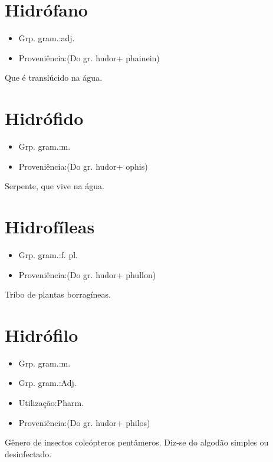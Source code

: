 \documentclass{article}
\begin{document}
\section{Hidrófano}
\begin{itemize}
\item {Grp. gram.:adj.}
\end{itemize}
\begin{itemize}
\item {Proveniência:(Do gr. \textunderscore hudor\textunderscore  + \textunderscore phainein\textunderscore )}
\end{itemize}
Que é translúcido na água.
\section{Hidrófido}
\begin{itemize}
\item {Grp. gram.:m.}
\end{itemize}
\begin{itemize}
\item {Proveniência:(Do gr. \textunderscore hudor\textunderscore  + \textunderscore ophis\textunderscore )}
\end{itemize}
Serpente, que vive na água.
\section{Hidrofíleas}
\begin{itemize}
\item {Grp. gram.:f. pl.}
\end{itemize}
\begin{itemize}
\item {Proveniência:(Do gr. \textunderscore hudor\textunderscore  + \textunderscore phullon\textunderscore )}
\end{itemize}
Tríbo de plantas borragíneas.
\section{Hidrófilo}
\begin{itemize}
\item {Grp. gram.:m.}
\end{itemize}
\begin{itemize}
\item {Grp. gram.:Adj.}
\end{itemize}
\begin{itemize}
\item {Utilização:Pharm.}
\end{itemize}
\begin{itemize}
\item {Proveniência:(Do gr. \textunderscore hudor\textunderscore  + \textunderscore philos\textunderscore )}
\end{itemize}
Gênero de insectos coleópteros pentâmeros.
Diz-se do algodão simples ou desinfectado.
\end{document}
